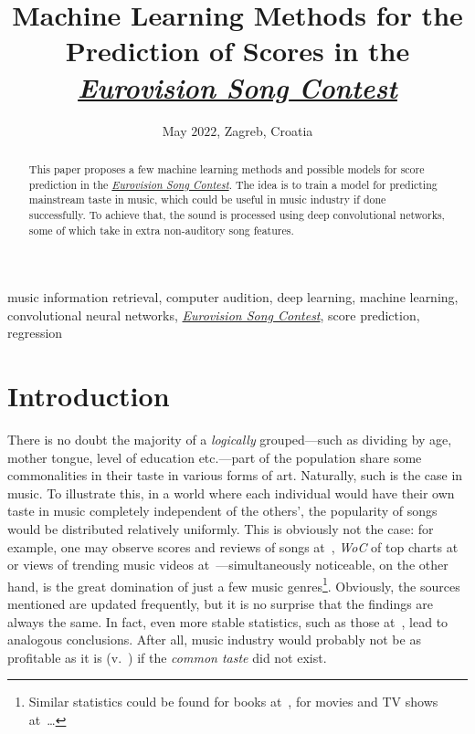 \documentclass[conference, a4paper, 12pt]{IEEEtran}
\title{
    Machine Learning Methods for the Prediction of Scores in the \href{http://eurovision.tv/}{\emph{Eurovision Song Contest}}
}
\author{
    \IEEEauthorblockN{Davor Penzar}
    \IEEEauthorblockA{
        \textit{freelancing data science and machine learning enthusiast} \\
        Zagreb, Croatia \\
        \href{mailto:davor.penzar@gmail.com}{davor.penzar@gmail.com}
    }
}
\date{May \ensuremath{2022}, Zagreb, Croatia}
\begin{document}
    \maketitle

    \begin{abstract}
        This paper proposes a few machine learning methods and possible models for score prediction in the \href{http://eurovision.tv/}{\emph{Eurovision Song Contest}}. The idea is to train a model for predicting mainstream taste in music, which could be useful in music industry if done successfully. To achieve that, the sound is processed using deep convolutional networks, some of which take in extra non-auditory song features.%
    \end{abstract}

    \begin{IEEEkeywords}
       music information retrieval, computer audition, deep learning, machine learning, convolutional neural networks, \href{http://eurovision.tv/}{\emph{Eurovision Song Contest}}, score prediction, regression
    \end{IEEEkeywords}

    \section{Introduction}
    \label{sec:introduction}

    There is no doubt the majority of a \emph{logically} grouped---such as dividing by age, mother tongue, level of education etc.---part of the population share some commonalities in their taste in various forms of art. Naturally, such is the case in music. To illustrate this, in a world where each individual would have their own taste in music completely independent of the others', the popularity of songs would be distributed relatively uniformly. This is obviously not the case: for example, one may observe scores and reviews of songs at~\cite{bib:AM}, \emph{WoC} of top charts at~\cite{bib:UKTop100} or views of trending music videos at~\cite{bib:YTTrend}---simultaneously noticeable, on the other hand, is the great domination of just a few music genres\footnote{Similar statistics could be found for books at~\cite{bib:GR}, for movies and TV shows at~\cite{bib:IMDb,bib:RT}\ldots}. Obviously, the sources mentioned are updated frequently, but it is no surprise that the findings are always the same. In fact, even more stable statistics, such as those at~\cite{bib:Cossar2019}, lead to analogous conclusions. After all, music industry would probably not be as profitable as it is (v.\ \cite{bib:Statista2021}) if the \emph{common taste} did not exist.
\end{document}
